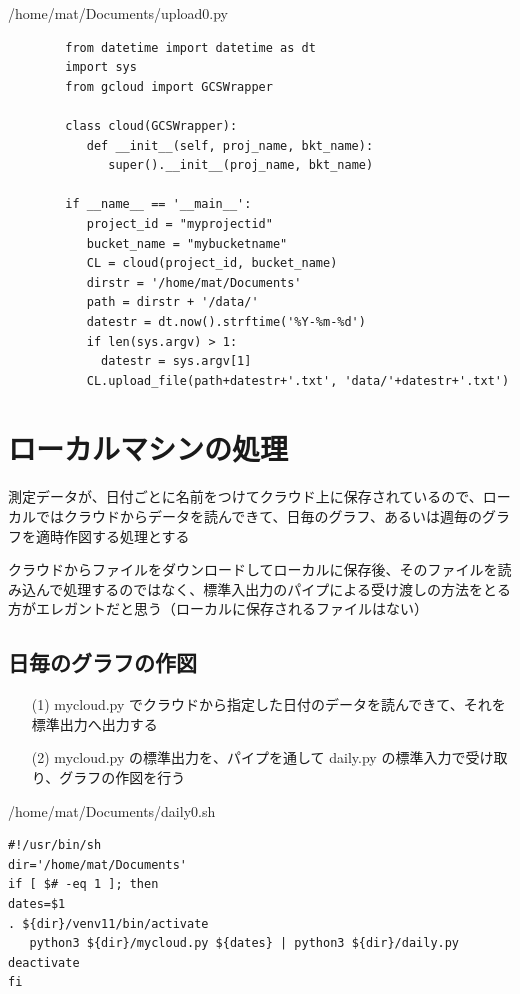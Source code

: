 \documentclass[12pt,a4paper,uplatex]{jsbook}
\begin{document}
\begin{itembox}[l]{/home/mat/Documents/upload0.py}
	\begin{verbatim}
		from datetime import datetime as dt
		import sys
		from gcloud import GCSWrapper
		
		class cloud(GCSWrapper):
		   def __init__(self, proj_name, bkt_name):
		      super().__init__(proj_name, bkt_name)
		
		if __name__ == '__main__':
		   project_id = "myprojectid"
		   bucket_name = "mybucketname"
		   CL = cloud(project_id, bucket_name)
		   dirstr = '/home/mat/Documents'
		   path = dirstr + '/data/'
		   datestr = dt.now().strftime('%Y-%m-%d')
		   if len(sys.argv) > 1:
		     datestr = sys.argv[1]
		   CL.upload_file(path+datestr+'.txt', 'data/'+datestr+'.txt')		
	\end{verbatim}	
\end{itembox}

\newpage

\section{ローカルマシンの処理}

測定データが、日付ごとに名前をつけてクラウド上に保存されているので、ローカルではクラウドからデータを読んできて、日毎のグラフ、あるいは週毎のグラフを適時作図する処理とする

クラウドからファイルをダウンロードしてローカルに保存後、そのファイルを読み込んで処理するのではなく、標準入出力のパイプによる受け渡しの方法をとる方がエレガントだと思う（ローカルに保存されるファイルはない）
\subsection{日毎のグラフの作図}

\begin{enumerate}
\item[(1)] mycloud.py でクラウドから指定した日付のデータを読んできて、それを標準出力へ出力する
\item[(2)] mycloud.py の標準出力を、パイプを通して daily.py の標準入力で受け取り、グラフの作図を行う
\end{enumerate}

\begin{itembox}[l]{/home/mat/Documents/daily0.sh}
	\begin{verbatim}
#!/usr/bin/sh
dir='/home/mat/Documents'
if [ $# -eq 1 ]; then
dates=$1
. ${dir}/venv11/bin/activate
   python3 ${dir}/mycloud.py ${dates} | python3 ${dir}/daily.py
deactivate
fi
	\end{verbatim}
\end{itembox}
\end{document}
